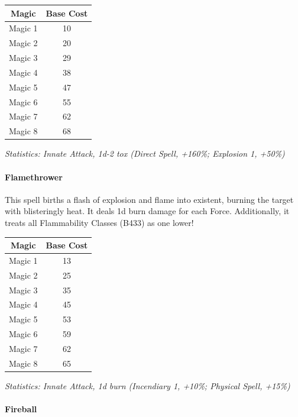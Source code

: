 \begin{multicols*}{3}
	\begin{center}
		\begin{tabular}{|c|c|}
			\hline
			Magic & Base Cost \\
			\hline
			\hline
			Magic 1 & 10 \\
			Magic 2 & 20 \\
			Magic 3 & 29 \\
			Magic 4 & 38 \\
			Magic 5 & 47 \\
			Magic 6 & 55 \\
			Magic 7 & 62 \\
			Magic 8 & 68 \\
			\hline
		\end{tabular}
	\end{center}
	
	\textcolor{OliveGreen}{\textit{Statistics: Innate Attack, 1d-2 tox (Direct Spell, +160\%; Explosion 1, +50\%)}}
	
	\paragraph{Flamethrower}
	
	This spell births a flash of explosion and flame into existent, burning the target with blisteringly heat. It deals 1d burn damage for each Force. Additionally, it treats all Flammability Classes (B433) as one lower!
	
	\begin{center}
		\begin{tabular}{|c|c|}
			\hline
			Magic & Base Cost \\
			\hline
			\hline
			Magic 1 & 13 \\
			Magic 2 & 25 \\
			Magic 3 & 35 \\
			Magic 4 & 45 \\
			Magic 5 & 53 \\
			Magic 6 & 59 \\
			Magic 7 & 62 \\
			Magic 8 & 65 \\
			\hline
		\end{tabular}
	\end{center}
	
	\textcolor{OliveGreen}{\textit{Statistics: Innate Attack, 1d burn (Incendiary 1, +10\%; Physical Spell, +15\%)}}
	
	\paragraph{Fireball}
	

\end{multicols*}
